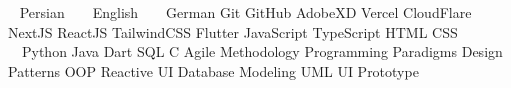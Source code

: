 

\begin{cvskills}

 {
   ~ Persian ~ 
   ~ English ~ 
   ~ German
}
 {
  Git \mitdiv GitHub \mitdiv AdobeXD \mitdiv {} Vercel \mitdiv CloudFlare
}
 {
  NextJS \mitdiv ReactJS \mitdiv TailwindCSS \mitdiv Flutter
}
 {
  JavaScript \mitdiv TypeScript \mitdiv HTML \mitdiv CSS 
}
\cvskill {} {
   \ \  Python \mitdiv Java \mitdiv Dart \mitdiv SQL \mitdiv C
}
 {
  Agile Methodology \mitdiv Programming Paradigms \mitdiv Design Patterns \mitdiv OOP
}
\cvskill {} {
  Reactive UI \mitdiv Database Modeling \mitdiv UML \mitdiv UI Prototype
}
\end{cvskills}

